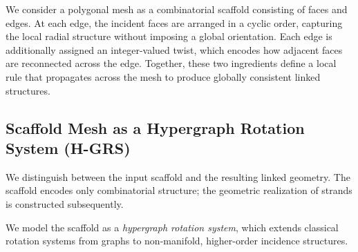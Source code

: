 \documentclass[acmtog,anonymous,review]{acmart}
\begin{document}
We consider a polygonal mesh as a combinatorial scaffold consisting of faces and edges. At each edge, the incident faces are arranged in a cyclic order, capturing the local radial structure without imposing a global orientation. Each edge is additionally assigned an integer-valued twist, which encodes how adjacent faces are reconnected across the edge. Together, these two ingredients define a local rule that propagates across the mesh to produce globally consistent linked structures.



\subsection{Scaffold Mesh as a Hypergraph Rotation System (H-GRS)}

We distinguish between the input scaffold and the resulting linked
geometry. The scaffold encodes only combinatorial structure; the
geometric realization of strands is constructed subsequently.

We model the scaffold as a \emph{hypergraph rotation system}, which
extends classical rotation systems from graphs to non-manifold,
higher-order incidence structures.
\end{document}
